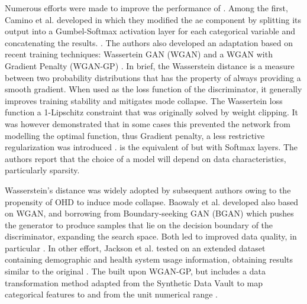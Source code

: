 Numerous efforts were made to improve the performance of . Among the first, Camino et al. developed  in which they modified the \gls{ae} component by splitting its output into a Gumbel-Softmax \cite{jang2016categorical} activation layer for each categorical variable and concatenating the results. \cite{Camino2018-re}. The authors also developed an adaptation based on recent training techniques: Wassertein GAN (WGAN) \cite{arjovsky2017wasserstein} and a WGAN with Gradient Penalty (WGAN-GP) \cite{gulrajani2017improved}. In brief, the Wasserstein distance is a measure between two probability distributions that has the property of always providing a smooth gradient. When used as the loss function of the discriminator, it generally improves training stability and mitigates mode collapse. The Wassertein loss function a 1-Lipschitz constraint that was originally solved by weight clipping. It was however demonstrated that in some cases this prevented the network from modelling the optimal function, thus Gradient penalty, a less restrictive regularization was introduced \cite{Petzka2018}.  is the equivalent of  but with Softmax layers. The authors report that the choice of a model will depend on data characteristics, particularly sparsity.\par 
Wasserstein's distance was widely adopted by subsequent authors owing to the propensity of OHD to induce mode collapse. Baowaly et al. developed  also based on WGAN, and  borrowing from Boundary-seeking GAN (BGAN) \cite{hjelm2017boundaryseeking} which pushes the generator to produce samples that lie on the decision boundary of the discriminator, expanding the search space. Both led to improved data quality, in particular  \cite{baowaly_2019_IEEE,baowaly_2019_jamia}. In other effort, Jackson et al. tested  on an extended dataset containing demographic and health system usage information, obtaining results similar to the original \cite{Jackson_2019}. The  built upon WGAN-GP, but includes a data transformation method adapted from the Synthetic Data Vault \cite{Patki_2016} to map categorical features to and from the unit numerical range \cite{Yale_2020}. 